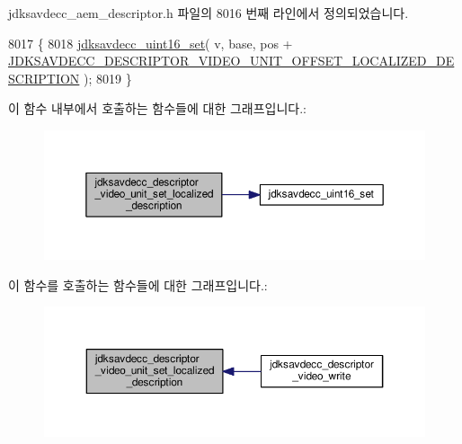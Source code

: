jdksavdecc\+\_\+aem\+\_\+descriptor.\+h 파일의 8016 번째 라인에서 정의되었습니다.


\begin{DoxyCode}
8017 \{
8018     \hyperlink{group__endian_ga14b9eeadc05f94334096c127c955a60b}{jdksavdecc\_uint16\_set}( v, base, pos + 
      \hyperlink{group__descriptor__video_gaa4afc9b13d38517d89696e708ce5855f}{JDKSAVDECC\_DESCRIPTOR\_VIDEO\_UNIT\_OFFSET\_LOCALIZED\_DESCRIPTION}
       );
8019 \}
\end{DoxyCode}


이 함수 내부에서 호출하는 함수들에 대한 그래프입니다.\+:
\nopagebreak
\begin{figure}[H]
\begin{center}
\leavevmode
\includegraphics[width=350pt]{group__descriptor__video_ga0cd32ebc3a78b8837a687dba54d82f18_cgraph}
\end{center}
\end{figure}




이 함수를 호출하는 함수들에 대한 그래프입니다.\+:
\nopagebreak
\begin{figure}[H]
\begin{center}
\leavevmode
\includegraphics[width=350pt]{group__descriptor__video_ga0cd32ebc3a78b8837a687dba54d82f18_icgraph}
\end{center}
\end{figure}


